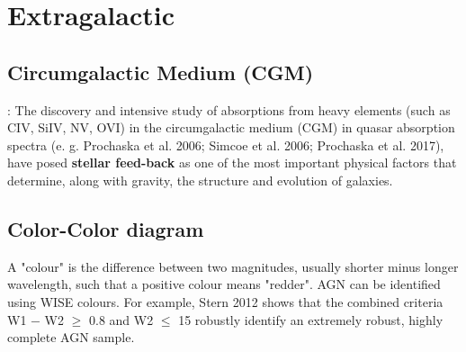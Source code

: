 \chapter{Extragalactic}








\section{Circumgalactic Medium (CGM)}
\cite{2023VasilievEvgenii} : The discovery and intensive study of absorptions from heavy elements (such as CIV, SiIV, NV, OVI) in the circumgalactic medium (CGM) in quasar absorption spectra (e. g. Prochaska et al. 2006; Simcoe et al. 2006; Prochaska et al. 2017),  have posed \textbf{stellar feed-back} as one of the most important physical factors that determine, along with gravity, the structure and evolution of galaxies.


\section{Color-Color diagram}

A "colour" is the difference between two magnitudes, usually shorter minus longer wavelength, such that a positive colour means "redder". AGN can be identified using WISE colours. For example, Stern 2012 shows that the combined criteria W1 − W2 $\geq$ 0.8 and W2 $\leq$ 15 robustly identify an extremely robust, highly complete AGN sample. 

